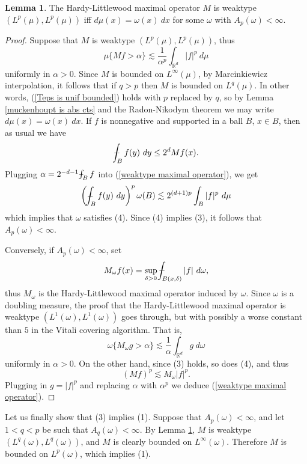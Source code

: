 \documentclass[12pt]{book}
\newcommand{\RR}{\mathbb{R}}
\def\Xint#1{\mathchoice
{\XXint\displaystyle\textstyle{#1}}%
{\XXint\textstyle\scriptstyle{#1}}%
{\XXint\scriptstyle\scriptscriptstyle{#1}}%
{\XXint\scriptscriptstyle\scriptscriptstyle{#1}}%
\!\int}
\def\XXint#1#2#3{{\setbox0=\hbox{$#1{#2#3}{\int}$ }
\vcenter{\hbox{$#2#3$ }}\kern-.6\wd0}}
\def\dashint{\Xint-}
\theoremstyle{definition}
\newtheorem{lemma}[theorem]{Lemma}
\begin{document}
\begin{lemma}
\label{HL is weaktype in Ap}
The Hardy-Littlewood maximal operator $M$ is weaktype $(L^p(\mu), L^p(\mu))$ iff $d\mu(x) = \omega(x) ~dx$ for some $\omega$ with $A_p(\omega) < \infty$.
\end{lemma}
\begin{proof}
Suppose that $M$ is weaktype $(L^p(\mu), L^p(\mu))$, thus
\begin{equation}
\label{weaktype maximal operator}
\mu\{Mf > \alpha\} \lesssim \frac{1}{\alpha^p} \int_{\RR^d} |f|^p ~d\mu
\end{equation}
uniformly in $\alpha > 0$. Since $M$ is bounded on $L^\infty(\mu)$, by Marcinkiewicz interpolation, it follows that if $q > p$ then $M$ is bounded on $L^q(\mu)$.
In other words, (\ref{Teps is unif bounded}) holds with $p$ replaced by $q$, so by Lemma \ref{muckenhoupt is abs cts} and the Radon-Nikodym theorem we may write $d\mu(x) = \omega(x)~dx$.
If $f$ is nonnegative and supported in a ball $B$, $x \in B$, then as usual we have
$$\dashint_B f(y)~dy \leq 2^d Mf(x).$$
Plugging $\alpha = 2^{-d-1}\dashint_B f$ into (\ref{weaktype maximal operator}), we get
$$\left(\dashint_B f(y) ~dy\right)^p \omega(B) \lesssim 2^{(d+1)p} \int_B |f|^p ~d\mu$$
which implies that $\omega$ satisfies (4). Since (4) implies (3), it follows that $A_p(\omega) < \infty$.

Conversely, if $A_p(\omega) < \infty$, set
$$M_\omega f(x) = \sup_{\delta > 0} \dashint_{B(x, \delta)} |f| ~d\omega,$$
thus $M_\omega$ is the Hardy-Littlewood maximal operator induced by $\omega$.
Since $\omega$ is a doubling measure, the proof that the Hardy-Littlewood maximal operator is weaktype $(L^1(\omega), L^1(\omega))$ goes through, but with possibly a worse constant than $5$ in the Vitali covering algorithm.
That is,
$$\omega\{M_\omega g > \alpha\} \lesssim \frac{1}{\alpha} \int_{\RR^d} g~d\omega$$
uniformly in $\alpha > 0$. On the other hand, since (3) holds, so does (4), and thus
$$(Mf)^p \lesssim M_\omega|f|^p.$$
Plugging in $g = |f|^p$ and replacing $\alpha$ with $\alpha^p$ we deduce (\ref{weaktype maximal operator}).
\end{proof}

Let us finally show that (3) implies (1).
Suppose that $A_p(\omega) < \infty$, and let $1 < q < p$ be such that $A_q(\omega) < \infty$.
By Lemma \ref{HL is weaktype in Ap}, $M$ is weaktype $(L^q(\omega), L^q(\omega))$, and $M$ is clearly bounded on $L^\infty(\omega)$.
Therefore $M$ is bounded on $L^p(\omega)$, which implies (1).
\end{document}
